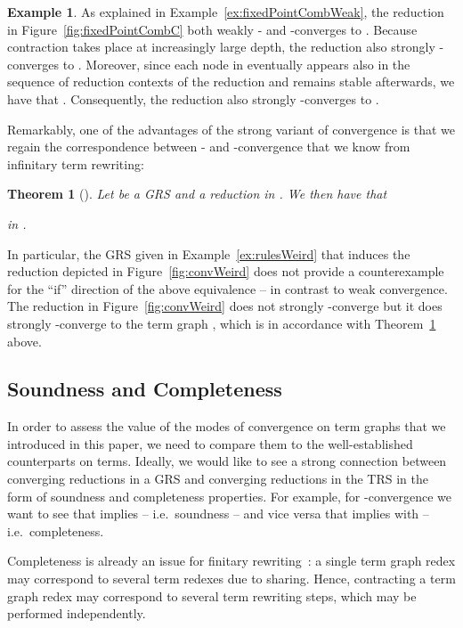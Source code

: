 \documentclass[copyright,creativecommons,UKenglish,final]{eptcs}
\theoremstyle{definition}
\newtheorem{example}{Example}[section]
\theoremstyle{plain}
\newtheorem{theorem}{Theorem}[section]
\begin{document}
\begin{example}
  As explained in Example~\ref{ex:fixedPointCombWeak}, the reduction
  in Figure~\ref{fig:fixedPointCombC} both weakly - and
  -converges to . Because contraction takes place at
  increasingly large depth, the reduction also strongly
  -converges to . Moreover, since each node in
   eventually appears also in the sequence of reduction
  contexts  of the reduction and remains stable
  afterwards, we have that . Consequently, the reduction also strongly
  -converges to .
\end{example}

Remarkably, one of the advantages of the strong variant of convergence
is that we regain the correspondence between - and
-convergence that we know from infinitary term rewriting:
\begin{theorem}[\cite{bahr12rta}]
  \label{thr:graphExt}
  Let  be a GRS and  a reduction in . We then have
  that
  \begin{center}
     \qquad {} \qquad  in .
  \end{center}
\end{theorem}

In particular, the GRS given in Example~\ref{ex:rulesWeird} that
induces the reduction depicted in Figure~\ref{fig:convWeird} does not
provide a counterexample for the ``if'' direction of the above
equivalence -- in contrast to weak convergence. The reduction in
Figure~\ref{fig:convWeird} does not strongly -converge but it
does strongly -converge to the term graph , which is in
accordance with Theorem~\ref{thr:graphExt} above.


\subsection{Soundness and Completeness}
\label{sec:soundness}

In order to assess the value of the modes of convergence on term
graphs that we introduced in this paper, we need to compare them to
the well-established counterparts on terms. Ideally, we would like to
see a strong connection between converging reductions in a GRS 
and converging reductions in the TRS  in the form of
soundness and completeness properties.  For example, for
-convergence we want to see that  implies
 -- i.e.\ soundness -- and
vice versa that  implies  with  -- i.e.\ completeness.

Completeness is already an issue for finitary
rewriting~\cite{kennaway94toplas}: a single term graph redex may
correspond to several term redexes due to sharing. Hence, contracting
a term graph redex may correspond to several term rewriting steps,
which may be performed independently.
\end{document}

